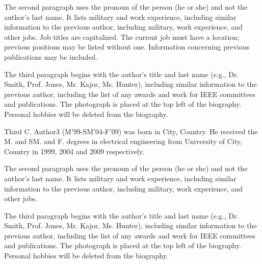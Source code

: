 \documentclass[journal]{IEEEtranTIE}
\begin{document}
{\begin{IEEEbiography}
The second paragraph uses the pronoun of the person (he or she) and not the author's last name. It lists military and work experience, including similar information to the previous author, including military, work experience, and other jobs. Job titles are capitalized. The current job must have a location; previous positions may be listed without one. Information concerning previous publications may be included.

The third paragraph begins with the author's title and last name (e.g., Dr. Smith, Prof. Jones, Mr. Kajor, Ms. Hunter), including similar information to the previous author, including the list of any awards and work for IEEE committees and publications. The photograph is placed at the top left of the biography. Personal hobbies will be deleted from the
biography.\\
\end{IEEEbiography}

\vspace{-2cm}
\begin{IEEEbiography}
{Third C. Author3} (M'99-SM'04-F'09) was born in City, Country. He received the M. and SM. and F. degrees in electrical engineering from University of City, Country in 1999, 2004 and 2009 respectively.

The second paragraph uses the pronoun of the person (he or she) and not the author's last name. It lists military and work experience, including similar information to the previous author, including military, work experience, and other jobs.

The third paragraph begins with the author's title and last name (e.g., Dr. Smith, Prof. Jones, Mr. Kajor, Ms. Hunter), including similar information to the previous author, including the list of any awards and work for IEEE committees and publications. The photograph is placed at the top left of the biography. Personal hobbies will be deleted from the biography.
\\ \\
\end{IEEEbiography}

}
\end{document}
